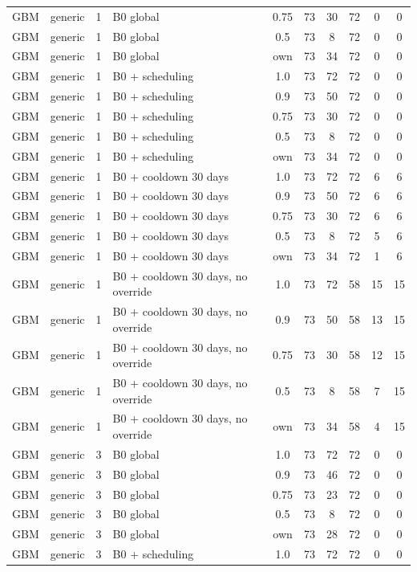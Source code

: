 \documentclass[10pt,onecolumn,letterpaper]{article}
\begin{document}
\begin{longtable}{lllp{4.4cm}cccccc}
GBM & generic & 1 & B0 global & 0.75 & 73 & 30 & 72 & 0 & 0 \\
GBM & generic & 1 & B0 global & 0.5 & 73 & 8 & 72 & 0 & 0 \\
GBM & generic & 1 & B0 global & own & 73 & 34 & 72 & 0 & 0 \\
GBM & generic & 1 & B0 + scheduling & 1.0 & 73 & 72 & 72 & 0 & 0 \\
GBM & generic & 1 & B0 + scheduling & 0.9 & 73 & 50 & 72 & 0 & 0 \\
GBM & generic & 1 & B0 + scheduling & 0.75 & 73 & 30 & 72 & 0 & 0 \\
GBM & generic & 1 & B0 + scheduling & 0.5 & 73 & 8 & 72 & 0 & 0 \\
GBM & generic & 1 & B0 + scheduling & own & 73 & 34 & 72 & 0 & 0 \\
GBM & generic & 1 & B0 + cooldown 30 days & 1.0 & 73 & 72 & 72 & 6 & 6 \\
GBM & generic & 1 & B0 + cooldown 30 days & 0.9 & 73 & 50 & 72 & 6 & 6 \\
GBM & generic & 1 & B0 + cooldown 30 days & 0.75 & 73 & 30 & 72 & 6 & 6 \\
GBM & generic & 1 & B0 + cooldown 30 days & 0.5 & 73 & 8 & 72 & 5 & 6 \\
GBM & generic & 1 & B0 + cooldown 30 days & own & 73 & 34 & 72 & 1 & 6 \\
GBM & generic & 1 & B0 + cooldown 30 days, no override & 1.0 & 73 & 72 & 58 & 15 & 15 \\
GBM & generic & 1 & B0 + cooldown 30 days, no override & 0.9 & 73 & 50 & 58 & 13 & 15 \\
GBM & generic & 1 & B0 + cooldown 30 days, no override & 0.75 & 73 & 30 & 58 & 12 & 15 \\
GBM & generic & 1 & B0 + cooldown 30 days, no override & 0.5 & 73 & 8 & 58 & 7 & 15 \\
GBM & generic & 1 & B0 + cooldown 30 days, no override & own & 73 & 34 & 58 & 4 & 15 \\
GBM & generic & 3 & B0 global & 1.0 & 73 & 72 & 72 & 0 & 0 \\
GBM & generic & 3 & B0 global & 0.9 & 73 & 46 & 72 & 0 & 0 \\
GBM & generic & 3 & B0 global & 0.75 & 73 & 23 & 72 & 0 & 0 \\
GBM & generic & 3 & B0 global & 0.5 & 73 & 8 & 72 & 0 & 0 \\
GBM & generic & 3 & B0 global & own & 73 & 28 & 72 & 0 & 0 \\
GBM & generic & 3 & B0 + scheduling & 1.0 & 73 & 72 & 72 & 0 & 0 \\

\end{longtable}
\end{document}
